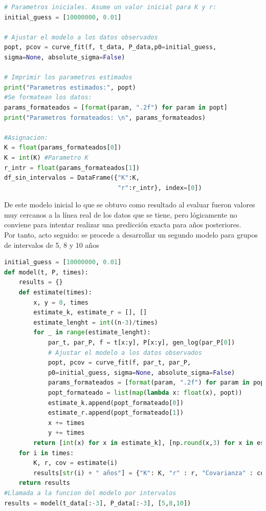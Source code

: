 \documentclass[a4paper,10pt,twocolumn]{article}
\begin{document}
\lstset{basicstyle=\tiny}
\begin{lstlisting}[language=Python, caption=Estimación de parámetros con la función sin intervalos]
# Parametros iniciales. Asume un valor inicial para K y r:
initial_guess = [10000000, 0.01]  

# Ajustar el modelo a los datos observados
popt, pcov = curve_fit(f, t_data, P_data,p0=initial_guess, 
sigma=None, absolute_sigma=False)

# Imprimir los parametros estimados
print("Parametros estimados:", popt)
#Se formatean los datos:
params_formateados = [format(param, ".2f") for param in popt]
print("Parametros formateados: \n", params_formateados)

#Asignacion:
K = float(params_formateados[0])
K = int(K) #Parametro K
r_intr = float(params_formateados[1]) 
df_sin_intervalos = DataFrame({"K":K, 
                               "r":r_intr}, index=[0])
\end{lstlisting}
De este modelo inicial lo que se obtuvo como resultado al evaluar fueron valores muy cercanos a la línea real de los datos que se tiene, pero lógicamente no conviene para intentar realizar una predicción exacta para años posteriores.\\
Por tanto, acto seguido: se procede a desarrollar un segundo modelo para grupos de intervalos de 5, 8 y 10 años

\lstset{basicstyle=\tiny}
\begin{lstlisting}[language=Python, caption=Estimación de parámetros de la función con intervalos]
initial_guess = [10000000, 0.01]
def model(t, P, times):
    results = {}
    def estimate(times):
        x, y = 0, times
        estimate_k, estimate_r = [], []
        estimate_lenght = int((n-3)/times)
        for _ in range(estimate_lenght):
            par_t, par_P, f = t[x:y], P[x:y], gen_log(par_P[0]) 
			# Ajustar el modelo a los datos observados
            popt, pcov = curve_fit(f, par_t, par_P, 
			p0=initial_guess, sigma=None, absolute_sigma=False)
            params_formateados = [format(param, ".2f") for param in popt]
            popt_formateado = list(map(lambda x: float(x), popt))
            estimate_k.append(popt_formateado[0])
            estimate_r.append(popt_formateado[1])
            x += times
            y += times
        return [int(x) for x in estimate_k], [np.round(x,3) for x in estimate_r], pcov
    for i in times:
        K, r, cov = estimate(i)
        results[str(i) + " años"] = {"K": K, "r" : r, "Covarianza" : cov}
    return results
#Llamada a la funcion del modelo por intervalos
results = model(t_data[:-3], P_data[:-3], [5,8,10])
\end{lstlisting}
\end{document}
